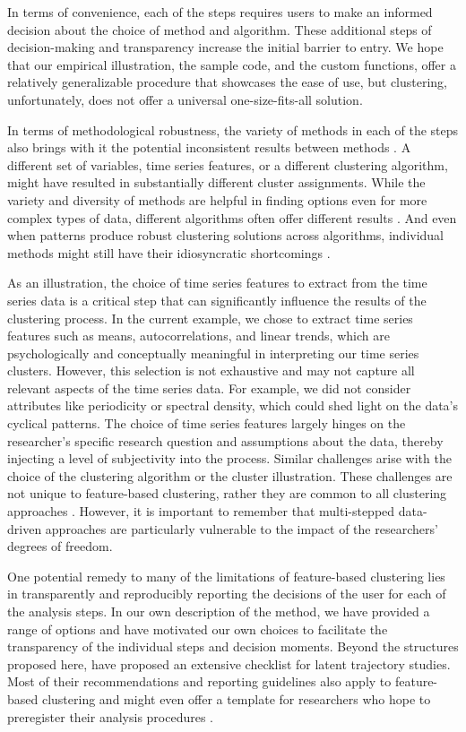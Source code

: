 \documentclass[man, 12pt, a4paper, floatsintext]{apa7}
\theoremstyle{break}
\theoremstyle{plain}
\begin{document}
In terms of convenience, each of the steps requires users to make an informed decision about the choice of method and algorithm. These additional steps of decision-making and transparency increase the initial barrier to entry. We hope that our empirical illustration, the sample code, and the custom functions, offer a relatively generalizable procedure that showcases the ease of use, but clustering, unfortunately, does not offer a universal one-size-fits-all solution. 

In terms of methodological robustness, the variety of methods in each of the steps also brings with it the potential inconsistent results between methods \citep[e.g.,][]{bastiaansen2019}. A different set of variables, time series features, or a different clustering algorithm, might have resulted in substantially different cluster assignments. While the variety and diversity of methods are helpful in finding options even for more complex types of data, different algorithms often offer different results \citep[e.g.,][]{keogh2005}. And even when patterns produce robust clustering solutions across algorithms, individual methods might still have their idiosyncratic shortcomings \citep{xu2015}. 

As an illustration, the choice of time series features to extract from the time series data is a critical step that can significantly influence the results of the clustering process. In the current example, we chose to extract time series features such as means, autocorrelations, and linear trends, which are psychologically and conceptually meaningful in interpreting our time series clusters. However, this selection is not exhaustive and may not capture all relevant aspects of the time series data. For example, we did not consider attributes like periodicity or spectral density, which could shed light on the data's cyclical patterns. The choice of time series features largely hinges on the researcher's specific research question and assumptions about the data, thereby injecting a level of subjectivity into the process. Similar challenges arise with the choice of the clustering algorithm or the cluster illustration. These challenges are not unique to feature-based clustering, rather they are common to all clustering approaches \citep{liao2005, horne2020}. However, it is important to remember that multi-stepped data-driven approaches are particularly vulnerable to the impact of the researchers' degrees of freedom.

One potential remedy to many of the limitations of feature-based clustering lies in transparently and reproducibly reporting the decisions of the user for each of the analysis steps. In our own description of the method, we have provided a range of options and have motivated our own choices to facilitate the transparency of the individual steps and decision moments. Beyond the structures proposed here, \citet{vandeschoot2017} have proposed an extensive checklist for latent trajectory studies. Most of their recommendations and reporting guidelines also apply to feature-based clustering and might even offer a template for researchers who hope to preregister their analysis procedures \citep[also see][]{kirtley2021}.
\end{document}
